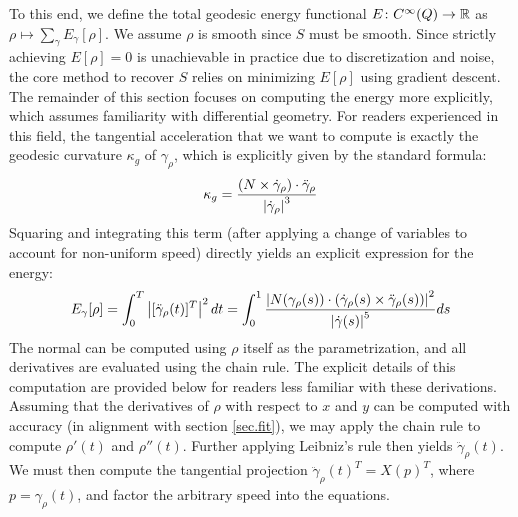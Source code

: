 \documentclass{article}
\begin{document}
To this end, we define the total geodesic energy functional $E \colon C^\infty(Q) \to \mathbb{R}$ as $\rho \mapsto \sum_\gamma E_\gamma[\rho]$. We assume $\rho$ is smooth since $S$ must be smooth. Since strictly achieving $E[\rho] = 0$ is unachievable in practice due to discretization and noise, the core method to recover $S$ relies on minimizing $E[\rho]$ using gradient descent. \\

The remainder of this section focuses on computing the energy more explicitly, which assumes familiarity with differential geometry. For readers experienced in this field, the tangential acceleration that we want to compute is exactly the geodesic curvature $\kappa_g$ of $\gamma_\rho$, which is explicitly given by the standard formula:
\[
  \kappa_g = \frac{(N \times \dot\gamma_\rho)\cdot \ddot\gamma_\rho}{\left\lvert \dot \gamma_\rho \right\rvert^3}
\]
Squaring and integrating this term (after applying a change of variables to account for non-uniform speed) directly yields an explicit expression for the energy:
\[
  E_\gamma[\rho] = \int_0^T \left\lvert [\ddot \gamma_\rho(t)]^T \right\rvert^2 dt = \int_0^1\frac{\left\lvert N(\gamma_\rho(s)) \cdot (\dot \gamma_\rho(s)\times \ddot \gamma_\rho(s)) \right\rvert^2}{\left\lvert \dot\gamma(s) \right\rvert^5}ds
\]
The normal can be computed using $\rho$ itself as the parametrization, and all derivatives are evaluated using the chain rule. The explicit details of this computation are provided below for readers less familiar with these derivations. \\

Assuming that the derivatives of $\rho$ with respect to $x$ and $y$ can be computed with accuracy (in alignment with section \ref{sec.fit}), 
we may apply the chain rule to compute $\rho'(t)$ and $\rho''(t)$. Further applying Leibniz's rule then yields $\ddot \gamma_\rho(t)$. We must then compute the tangential projection $\ddot \gamma_\rho(t)^T = X(p)^T$, where $p = \gamma_\rho(t)$, and factor the arbitrary speed into the equations. \\
\end{document}
